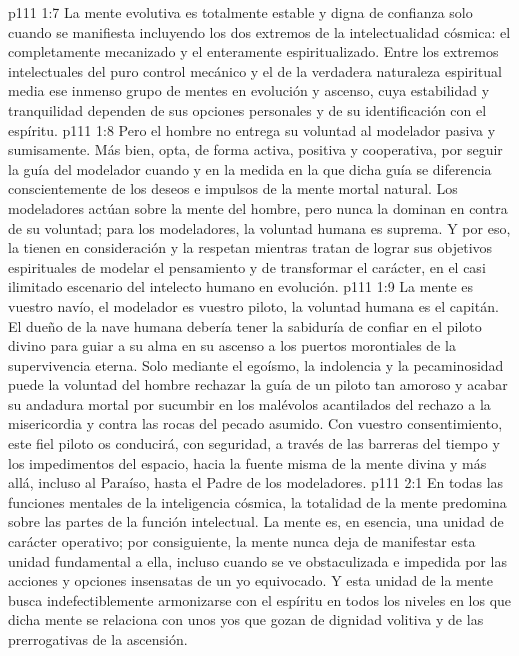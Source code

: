 \vs p111 1:7 \pc La mente evolutiva es totalmente estable y digna de confianza solo cuando se manifiesta incluyendo los dos extremos de la intelectualidad cósmica: el completamente mecanizado y el enteramente espiritualizado. Entre los extremos intelectuales del puro control mecánico y el de la verdadera naturaleza espiritual media ese inmenso grupo de mentes en evolución y ascenso, cuya estabilidad y tranquilidad dependen de sus opciones personales y de su identificación con el espíritu.
\vs p111 1:8 Pero el hombre no entrega su voluntad al modelador pasiva y sumisamente. Más bien, opta, de forma activa, positiva y cooperativa, por seguir la guía del modelador cuando y en la medida en la que dicha guía se diferencia conscientemente de los deseos e impulsos de la mente mortal natural. Los modeladores actúan sobre la mente del hombre, pero nunca la dominan en contra de su voluntad; para los modeladores, la voluntad humana es suprema. Y por eso, la tienen en consideración y la respetan mientras tratan de lograr sus objetivos espirituales de modelar el pensamiento y de transformar el carácter, en el casi ilimitado escenario del intelecto humano en evolución.
\vs p111 1:9 \pc La mente es vuestro navío, el modelador es vuestro piloto, la voluntad humana es el capitán. El dueño de la nave humana debería tener la sabiduría de confiar en el piloto divino para guiar a su alma en su ascenso a los puertos morontiales de la supervivencia eterna. Solo mediante el egoísmo, la indolencia y la pecaminosidad puede la voluntad del hombre rechazar la guía de un piloto tan amoroso y acabar su andadura mortal por sucumbir en los malévolos acantilados del rechazo a la misericordia y contra las rocas del pecado asumido. Con vuestro consentimiento, este fiel piloto os conducirá, con seguridad, a través de las barreras del tiempo y los impedimentos del espacio, hacia la fuente misma de la mente divina y más allá, incluso al Paraíso, hasta el Padre de los modeladores.
\vs p111 2:1 En todas las funciones mentales de la inteligencia cósmica, la totalidad de la mente predomina sobre las partes de la función intelectual. La mente es, en esencia, una unidad de carácter operativo; por consiguiente, la mente nunca deja de manifestar esta unidad fundamental a ella, incluso cuando se ve obstaculizada e impedida por las acciones y opciones insensatas de un yo equivocado. Y esta unidad de la mente busca indefectiblemente armonizarse con el espíritu en todos los niveles en los que dicha mente se relaciona con unos yos que gozan de dignidad volitiva y de las prerrogativas de la ascensión.
